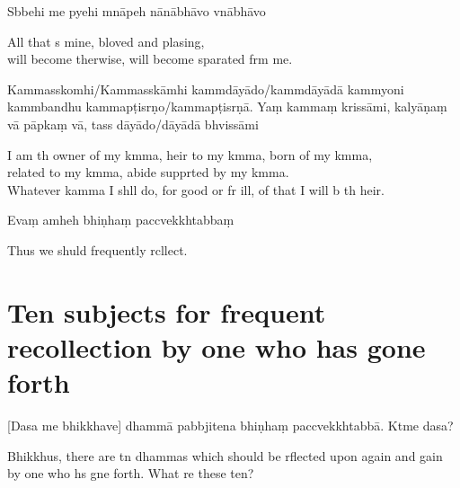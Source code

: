 Sbbehi me pyehi mnāpeh nānābhāvo vnābhāvo

\begin{english}
  All that s mine, bloved and plasing,\\
  will become therwise, will become sparated frm me.
\end{english}

Kammasskomhi/Kammasskāmhi kammdāyādo/kammdāyādā kammyoni kammbandhu kammapṭisrṇo/kammapṭisrṇā. Yaṃ kammaṃ krissāmi, kalyāṇaṃ vā pāpkaṃ vā, tass dāyādo/dāyādā bhvissāmi

\begin{english}
  I am th owner of my kmma, heir to my kmma, born of my kmma,\\
  related to my kmma, abide supprted by my kmma.\\
  Whatever kamma I shll do, for good or fr ill, of that I will b th heir.
\end{english}

Evaṃ amheh bhiṇhaṃ paccvekkhtabbaṃ

\begin{english}
  Thus we shuld frequently rcllect.
\end{english}

\clearpage

\chapter[Ten Subjects]{Ten subjects for frequent recollection by one who has gone forth}%

\enlargethispage{\baselineskip}

\begin{leader}
\end{leader}

[Dasa me bhikkhave] dhammā pabbjitena bhiṇhaṃ paccvekkhtabbā. Ktme dasa?

\begin{english}
  Bhikkhus, there are tn dhammas which should be rflected upon again and gain by one who hs gne forth. What re these ten?
\end{english}

